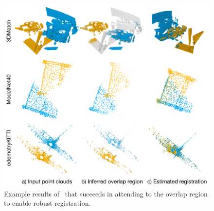 \begin{figure}[t]
    \centering
    \includegraphics[width=\columnwidth]{figures/images/qualitative_all.pdf}
    \caption{Example results of \acro\ that succeeds in attending to the overlap region to enable robust registration.}
    \label{fig:3DMatch_qualitative}
\end{figure}